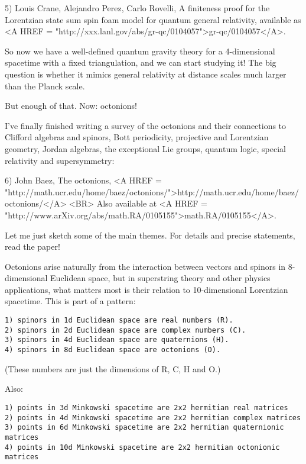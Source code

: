 5) Louis Crane, Alejandro Perez, Carlo Rovelli, A finiteness proof for
the Lorentzian state sum spin foam model for quantum general relativity,
available as <A HREF = "http://xxx.lanl.gov/abs/gr-qc/0104057">gr-qc/0104057</A>.

So now we have a well-defined quantum gravity theory for a 4-dimensional
spacetime with a fixed triangulation, and we can start studying it!  The
big question is whether it mimics general relativity at distance scales
much larger than the Planck scale.

But enough of that.   Now: octonions!

I've finally finished writing a survey of the octonions and their
connections to Clifford algebras and spinors, Bott periodicity, 
projective and Lorentzian geometry, Jordan algebras, the exceptional 
Lie groups, quantum logic, special relativity and supersymmetry:

6) John Baez, The octonions, 
<A HREF =
"http://math.ucr.edu/home/baez/octonions/">http://math.ucr.edu/home/baez/octonions/</A>
<BR>
Also available at <A HREF = "http://www.arXiv.org/abs/math.RA/0105155">math.RA/0105155</A>.

Let me just sketch some of the main themes.  For details and precise
statements, read the paper!

Octonions arise naturally from the interaction between vectors and
spinors in 8-dimensional Euclidean space, but in superstring theory and
other physics applications, what matters most is their relation to
10-dimensional Lorentzian spacetime.  This is part of a pattern:

\begin{verbatim}
1) spinors in 1d Euclidean space are real numbers (R).
2) spinors in 2d Euclidean space are complex numbers (C).
3) spinors in 4d Euclidean space are quaternions (H).
4) spinors in 8d Euclidean space are octonions (O).
\end{verbatim}
    
(These numbers are just the dimensions of R, C, H and O.)

Also:

\begin{verbatim}
1) points in 3d Minkowski spacetime are 2x2 hermitian real matrices
2) points in 4d Minkowski spacetime are 2x2 hermitian complex matrices
3) points in 6d Minkowski spacetime are 2x2 hermitian quaternionic matrices
4) points in 10d Minkowski spacetime are 2x2 hermitian octonionic matrices
\end{verbatim}
    
